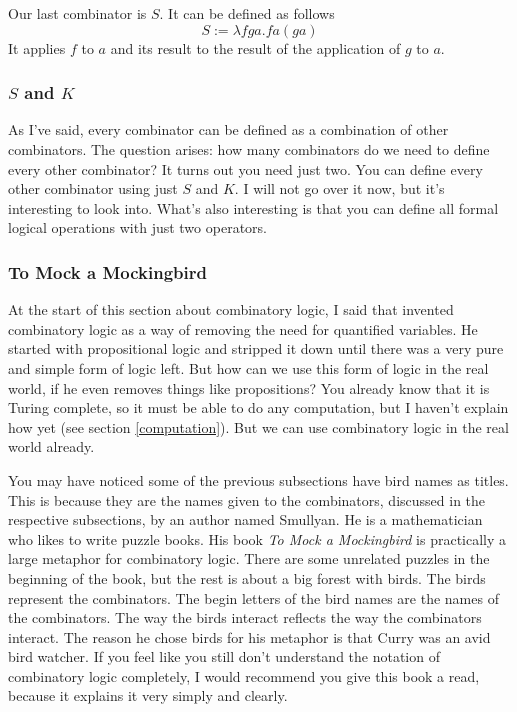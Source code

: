 \documentclass[11pt]{article}
\begin{document}
Our last combinator is \(S\). It can be defined as follows
\[S:=\lambda fga.fa(ga)\]
It applies \(f\) to \(a\) and its result to the result of the application of
\(g\) to \(a\).

\subsubsection{\(S\) and \(K\)}


As I've said, every combinator can be defined as a combination of other
combinators. The question arises: how many combinators do we need to define
every other combinator? It turns out you need just two. You can define every
other combinator using just \(S\) and \(K\). I will not go over it now, but
it's interesting to look into. What's also interesting is that you can define
all formal logical operations with just two operators.

\subsubsection{To Mock a Mockingbird}

At the start of this section about combinatory logic, I said that
\textcite{schonfinkel1924} invented combinatory logic as a way of removing the
need for quantified variables. He started with propositional logic and stripped
it down until there was a very pure and simple form of logic left. But how can
we use this form of logic in the real world, if he even removes things like
propositions? You already know that it is Turing complete, so it must be able
to do any computation, but I haven't explain how yet (see section
\ref{computation}). But we can use combinatory logic in the real world already.

You may have noticed some of the previous subsections have bird names as
titles. This is because they are the names given to the combinators, discussed
in the respective subsections, by an author named Smullyan. He is a
mathematician who likes to write puzzle books. His book \emph{To Mock a
Mockingbird} \parencite{smullyan2000} is practically a large metaphor for
combinatory logic. There are some unrelated puzzles in the beginning of the
book, but the rest is about a big forest with birds. The birds represent the
combinators. The begin letters of the bird names are the names of the
combinators. The way the birds interact reflects the way the combinators
interact. The reason he chose birds for his metaphor is that Curry was an avid
bird watcher. If you feel like you still don't understand the notation of
combinatory logic completely, I would recommend you give this book a read,
because it explains it very simply and clearly.
\end{document}
